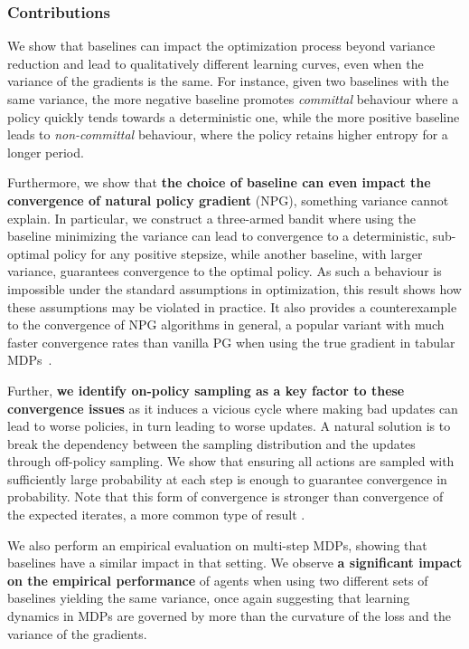 \subsubsection*{Contributions}
We show that baselines can impact the optimization process 
beyond variance reduction and lead to qualitatively different learning curves, even when the variance of the gradients is the same. 
For instance, given two baselines with the same variance, the more negative baseline promotes \textit{committal} behaviour where a policy quickly tends towards a deterministic one, while the more positive baseline leads to \textit{non-committal} behaviour, where the policy retains higher entropy for a longer period.

Furthermore, we show that \textbf{the choice of baseline can even impact the convergence of natural policy gradient} (NPG), something variance cannot explain. In particular, we construct a three-armed bandit where using the baseline minimizing the variance can lead to convergence to a deterministic, sub-optimal policy for any positive stepsize, while another baseline, with larger variance, guarantees convergence to the optimal policy. As such a behaviour is impossible under the standard assumptions in optimization, this result shows how these assumptions may be violated in practice. It also provides a counterexample to the convergence of NPG algorithms in general, a popular variant with much faster convergence rates than vanilla PG when using the true gradient in tabular MDPs~\citep{agarwal2019optimality}. 

Further, \textbf{we identify on-policy sampling as a key factor to these convergence issues} as it induces a vicious cycle where making bad updates can lead to worse policies, in turn leading to worse updates. A natural solution is to break the dependency between the sampling distribution and the updates through off-policy sampling. We show that ensuring all actions are sampled with sufficiently large probability at each step is enough to guarantee convergence in probability. Note that this form of convergence is stronger than convergence of the expected iterates, a more common type of result \citep[e.g.,][]{mei2020global,agarwal2019optimality}.

We also perform an empirical evaluation on multi-step MDPs, showing that baselines have a similar impact in that setting. We observe \textbf{a significant impact on the empirical performance} of agents when using two different sets of baselines yielding the same variance, once again suggesting that learning dynamics in MDPs are governed by more than the curvature of the loss and the variance of the gradients.



